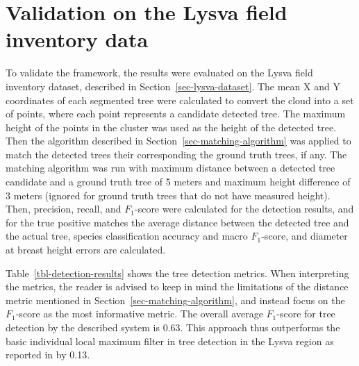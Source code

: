 \section{Validation on the Lysva field inventory data}

To validate the framework, the results were evaluated on the Lysva field inventory dataset, described in Section~\ref{sec-lysva-dataset}.
The mean X and Y coordinates of each segmented tree were calculated to convert the cloud into a set of points, where each point represents a candidate detected tree.
The maximum height of the points in the cluster was used as the height of the detected tree.
Then the algorithm described in Section~\ref{sec-matching-algorithm} was applied to match the detected trees their corresponding the ground truth trees, if any.
The matching algorithm was run with maximum distance between a detected tree candidate and a ground truth tree of 5 meters and maximum height difference of 3 meters (ignored for ground truth trees that do not have measured height).
Then, precision, recall, and $F_1$-score were calculated for the detection results, and for the true positive matches the average distance between the detected tree and the actual tree, species classification accuracy and macro $F_1$-score, and diameter at breast height errors are calculated.

Table~\ref{tbl-detection-results} shows the tree detection metrics.
When interpreting the metrics, the reader is advised to keep in mind the limitations of the distance metric mentioned in Section~\ref{sec-matching-algorithm}, and instead focus on the $F_1$-score as the most informative metric.
The overall average $F_1$-score for tree detection by the described system is 0.63.
This approach thus outperforms the basic individual local maximum filter in tree detection in the Lysva region as reported in \citet{dubrovinOpenDatasetIndividual2024} by 0.13.

